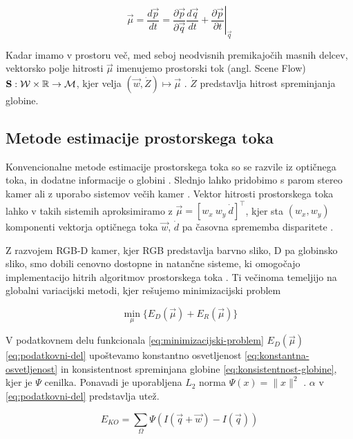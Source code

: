\begin{equation}\label{eq:scene-flow}
	\vec{\mu} = \frac{d\vec{p}}{dt} = \frac{\partial \vec{p}}{\partial \vec{q}} \frac{d\vec{q}}{dt} + \left.\frac{\partial \vec{p}}{\partial t}\right|_\vec{q}
\end{equation}

Kadar imamo v prostoru več, med seboj neodvisnih premikajočih masnih delcev, vektorsko polje hitrosti $\vec{\mu}$ imenujemo prostorski tok (angl. Scene Flow) $\mathbf{S}: \mathcal{W} \times \mathbb{R} \to \mathcal{M}$, kjer velja $(\vec{w}, \dot{Z}) \mapsto \vec{\mu}$ \cite{yan2016scene}. $\dot{Z}$ predstavlja hitrost spreminjanja globine.

\subsection{Metode estimacije prostorskega toka}
Konvencionalne metode estimacije prostorskega toka so se razvile iz optičnega toka, in dodatne informacije o globini \cite{yan2016scene}. Slednjo lahko pridobimo s parom stereo kamer ali z uporabo sistemov večih kamer \cite{jaimez2015primal}. Vektor hitrosti prostorskega toka lahko v takih sistemih aproksimiramo z $\vec{\mu} = \left[w_x~w_y~\dot{d}\right]^\top$, kjer sta $(w_x, w_y)$ komponenti vektorja optičnega toka $\vec{w}$, $\dot{d}$ pa časovna sprememba disparitete \cite{yan2016scene}.

Z razvojem RGB-D kamer, kjer RGB predstavlja barvno sliko, D pa globinsko sliko, smo dobili cenovno dostopne in natančne sisteme, ki omogočajo implementacijo hitrih algoritmov prostorskega toka \cite{yan2016scene,jaimez2015primal}. Ti večinoma temeljijo na globalni variacijski metodi, kjer rešujemo minimizacijski problem 

\begin{equation}\label{eq:minimizacijski-problem}
	\min_{\mu}\{E_D(\vec{\mu}) + E_R(\vec{\mu})\}
\end{equation}

V podatkovnem delu funkcionala \eqref{eq:minimizacijski-problem} $E_D(\vec{\mu})$ \eqref{eq:podatkovni-del} upoštevamo konstantno osvetljenost \eqref{eq:konstantna-osvetljenost} in konsistentnost spreminjana globine \eqref{eq:konsistentnost-globine}, kjer je  $\Psi$ cenilka. Ponavadi je uporabljena $L_2$ norma $\Psi(x) = \| x \|^2$ \cite{yan2016scene}. $\alpha$ v \eqref{eq:podatkovni-del} predstavlja utež.

\begin{equation}\label{eq:konstantna-osvetljenost}
	E_{KO} = \sum_\Omega \Psi( I(\vec{q} + \vec{w}) - I(\vec{q}))
\end{equation}

